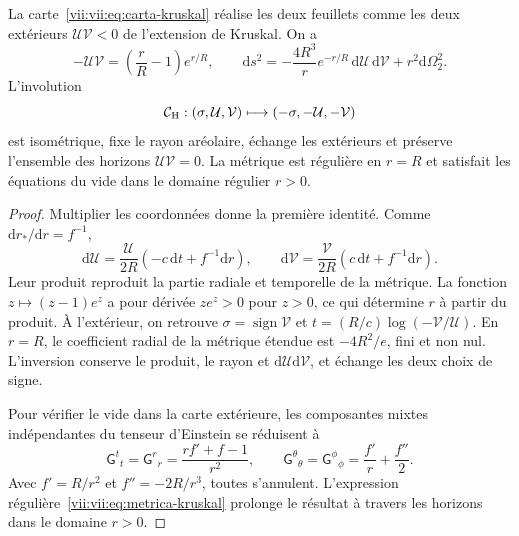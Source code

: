 \begin{theorem}
\label{vii:vii:thm:kruskal-hojas}
La carte~\eqref{vii:vii:eq:carta-kruskal} réalise les deux feuillets comme les deux extérieurs \(\mathcal U\mathcal V<0\) de l'extension de Kruskal. On a
\begin{equation}
 -\mathcal U\mathcal V=\left(\frac rR-1\right)e^{r/R},\qquad
 \mathrm ds^2=-\frac{4R^3}{r}e^{-r/R}\,
                    \mathrm d\mathcal U\,\mathrm d\mathcal V
                    +r^2\mathrm d\Omega_2^2.
 \label{vii:vii:eq:metrica-kruskal}
\end{equation}
L'involution
\begin{equation}
 \mathcal C_{\rm H}:(\sigma,\mathcal U,\mathcal V)
 \longmapsto(-\sigma,-\mathcal U,-\mathcal V)
 \label{vii:vii:eq:involucion-horizonte}
\end{equation}
est isométrique, fixe le rayon aréolaire, échange les extérieurs et préserve
l'ensemble des horizons \(\mathcal U\mathcal V=0\).
La métrique est régulière en \(r=R\) et satisfait les équations du vide
dans le domaine régulier \(r>0\).
\end{theorem}
\begin{proof}
Multiplier les coordonnées donne la première identité. Comme
\(\mathrm dr_*/\mathrm dr=f^{-1}\),
\[
 \mathrm d\mathcal U=\frac{\mathcal U}{2R}
            (-c\,\mathrm dt+f^{-1}\mathrm dr),\qquad
 \mathrm d\mathcal V=\frac{\mathcal V}{2R}
            ( c\,\mathrm dt+f^{-1}\mathrm dr).
\]
Leur produit reproduit la partie radiale et temporelle de la métrique.
La fonction \(z\mapsto(z-1)e^z\) a pour dérivée \(ze^z>0\)
pour \(z>0\), ce qui détermine \(r\) à partir du produit.
À l'extérieur, on retrouve
\(\sigma=\operatorname{sign}\mathcal V\) et
\(t=(R/c)\log(-\mathcal V/\mathcal U)\).
En \(r=R\), le coefficient radial de la métrique étendue est
\(-4R^2/e\), fini et non nul. L'inversion conserve le
produit, le rayon et \(\mathrm d\mathcal U\mathrm d\mathcal V\),
et échange les deux choix de signe.

Pour vérifier le vide dans la carte extérieure, les composantes mixtes indépendantes du tenseur d'Einstein se réduisent à
\[
 \mathsf G^t{}_t=\mathsf G^r{}_r
 =\frac{rf'+f-1}{r^2},\qquad
 \mathsf G^\theta{}_\theta=\mathsf G^\phi{}_\phi
 =\frac{f'}r+\frac{f''}2.
\]
Avec \(f'=R/r^2\) et \(f''=-2R/r^3\), toutes s'annulent. L'expression régulière~\eqref{vii:vii:eq:metrica-kruskal} prolonge le résultat à travers les horizons dans le domaine \(r>0\).
\end{proof}


